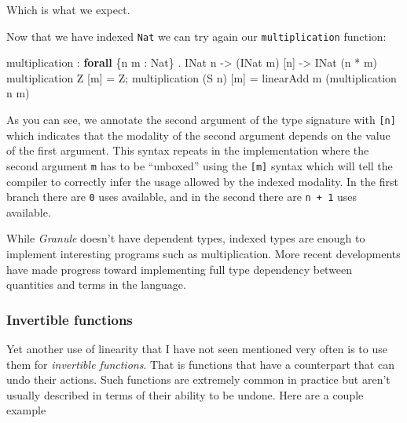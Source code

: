 \documentclass[
]{article}
\newenvironment{Shaded}{}{}
\newcommand{\DataTypeTok}[1]{\textcolor[rgb]{0.56,0.13,0.00}{#1}}
\newcommand{\KeywordTok}[1]{\textcolor[rgb]{0.00,0.44,0.13}{\textbf{#1}}}
\newcommand{\NormalTok}[1]{#1}
\newcommand{\OperatorTok}[1]{\textcolor[rgb]{0.40,0.40,0.40}{#1}}
\newcommand{\OtherTok}[1]{\textcolor[rgb]{0.00,0.44,0.13}{#1}}
\begin{document}
Which is what we expect.

Now that we have indexed \texttt{Nat} we can try again our
\texttt{multiplication} function:

\begin{Shaded}
\begin{Highlighting}[]
\NormalTok{multiplication }\OperatorTok{:} \KeywordTok{forall}\NormalTok{ \{n m }\OperatorTok{:} \DataTypeTok{Nat}\NormalTok{\} }\OperatorTok{.} \DataTypeTok{INat}\NormalTok{ n }\OtherTok{{-}\textgreater{}}\NormalTok{ (}\DataTypeTok{INat}\NormalTok{ m) [n] }\OtherTok{{-}\textgreater{}} \DataTypeTok{INat}\NormalTok{ (n }\OperatorTok{*}\NormalTok{ m)}
\NormalTok{multiplication }\DataTypeTok{Z}\NormalTok{ [m] }\OtherTok{=} \DataTypeTok{Z}\NormalTok{;}
\NormalTok{multiplication (}\DataTypeTok{S}\NormalTok{ n) [m] }\OtherTok{=}\NormalTok{ linearAdd m (multiplication n m)}
\end{Highlighting}
\end{Shaded}

As you can see, we annotate the second argument of the type signature
with \texttt{{[}n{]}} which indicates that the modality of the second
argument depends on the value of the first argument. This syntax repeats
in the implementation where the second argument \texttt{m} has to be
``unboxed'' using the \texttt{{[}m{]}} syntax which will tell the
compiler to correctly infer the usage allowed by the indexed modality.
In the first branch there are \texttt{0} uses available, and in the
second there are \texttt{n\ +\ 1} uses available.

While \emph{Granule} doesn't have dependent types, indexed types are
enough to implement interesting programs such as multiplication. More
recent developments have made progress toward implementing full type
dependency between quantities and terms in the language.

\hypertarget{invertible-functions}{%
\subsubsection{Invertible functions}\label{invertible-functions}}

Yet another use of linearity that I have not seen mentioned very often
is to use them for \emph{invertible functions}. That is functions that
have a counterpart that can undo their actions. Such functions are
extremely common in practice but aren't usually described in terms of
their ability to be undone. Here are a couple example
\end{document}

